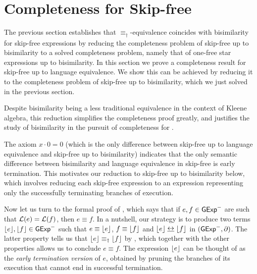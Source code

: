 \documentclass[orivec,envcountsect,envcountsame]{llncs}
\begin{document}
\section{Completeness for Skip-free  \GKAT}\label{sec:completeness for skip-free GKAT}

The previous section establishes that \(\equiv_\dagger\)-equivalence coincides with bisimilarity for skip-free \GKAT expressions by reducing the completeness problem of skip-free \GKAT up to bisimilarity to a solved completeness problem, namely that of one-free star expressions up to bisimilarity.
In this section we prove a completeness result for skip-free \GKAT up to language equivalence.
We show this can be achieved by reducing it to the completeness problem of skip-free \GKAT up to bisimilarity, which we just solved in the previous section.

Despite bisimilarity being a less traditional equivalence in the context of Kleene algebra, this reduction simplifies the completeness proof greatly, and justifies the study of bisimilarity in the pursuit of completeness for \GKAT. %

The axiom \(x \cdot 0 = 0\) (which is the only difference between skip-free \GKAT up to language equivalence and skip-free \GKAT up to bisimilarity) indicates that the only semantic difference between bisimilarity and language equivalence in skip-free \GKAT is early termination.
This motivates our reduction to skip-free \GKAT up to bisimilarity below, which involves reducing each skip-free expression to an expression representing only the successfully terminating branches of execution.

Now let us turn to the formal proof of , which says that if $e, f \in \mathsf{GExp}^-$ are such that $\mathcal{L}(e) = \mathcal{L}(f)$, then $e \equiv f$.
In a nutshell, our strategy is to produce two terms $\lfloor e\rfloor, \lfloor f\rfloor \in \mathsf{GExp}^-$ such that $e \equiv \lfloor e\rfloor$, $f \equiv \lfloor f\rfloor$ and $\floor{e} \bisim \floor{f}$ in \((\mathsf{GExp}^-, \partial)\).
The latter property tells us that $\lfloor e\rfloor \equiv_\dagger \lfloor f\rfloor$ by , which together with the other properties allows us to conclude $e \equiv f$.
The expression \(\lfloor e\rfloor\) can be thought of as the \emph{early termination version} of \(e\), obtained by pruning the branches of its execution that cannot end in successful termination.
\end{document}
